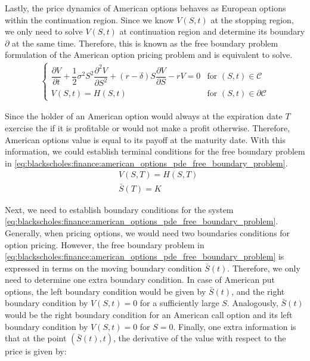 Lastly, the price dynamics of American options behaves as European options within
the continuation region. Since we know $V(S, t)$ at the stopping region, we only
need to solve $V(S,t)$ at continuation region and determine its boundary $\partial$
at the same time. Therefore, this is known as the free boundary problem formulation
of the American option pricing problem and is equivalent to solve.
\begin{align}
  \begin{cases}
  \dfrac{\partial{V}}{\partial{t}} + \dfrac{1}{2}\sigma^{2} S^2 \dfrac{\partial^2{V}}{\partial{S^2}} + (r - \delta)S \dfrac{\partial{V}}{\partial{S}} - rV = 0 & \text{for $(S, t) \in \mathcal{C}$} \\
  V(S, t) = H(S, t) & \text{for $(S,t)\in \partial\mathcal{C}$}
  \end{cases}
  \label{eq:blackscholes:finance:american_options_pde_free_boundary_problem}
\end{align}

Since the holder of an American option would always at the expiration date $T$
exercise the if it is profitable or would not make a profit otherwise. Therefore,
American options value is equal to its payoff at the maturity date. With this 
information, we could establish terminal conditions for the free boundary problem 
in \eqref{eq:blackscholes:finance:american_options_pde_free_boundary_problem}.
\begin{align*}
  & V(S,T) = H(S, T) \\
  & \bar{S}(T) = K
\end{align*}

Next, we need to establish boundary conditions for the system 
\eqref{eq:blackscholes:finance:american_options_pde_free_boundary_problem}. 
Generally, when pricing options, we would need two boundaries conditions 
for option pricing. However, the free boundary problem in 
\eqref{eq:blackscholes:finance:american_options_pde_free_boundary_problem}
is expressed in terms on the moving boundary condition $\bar{S}(t)$. Therefore,
we only need to determine one extra boundary condition. In case of 
American put options, the left boundary condition would be given by $\bar{S}(t)$,
and the right boundary condition by $V(S, t) = 0$ for a sufficiently large $S$. 
Analogously, $\bar{S}(t)$ would be the right boundary condition for 
an American call option and its left boundary condition by $V(S, t) = 0$ for $S = 0$. 
Finally, one extra information is that at the point $(\bar{S}(t), t)$, the 
derivative of the value with respect to the price is given by:

